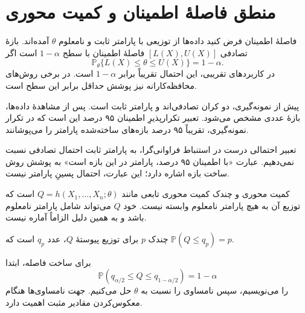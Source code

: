 \documentclass[12pt,a4paper,oneside]{report}
\newcommand{\Prob}{\mathbb P}
\begin{document}
\section{منطق فاصلهٔ اطمینان و کمیت محوری}
\begin{definition}{فاصلهٔ اطمینان}
فرض کنید داده‌ها از توزیعی با پارامتر ثابت و نامعلوم $\theta$ آمده‌اند. بازهٔ تصادفی $[L(X),U(X)]$ فاصلهٔ اطمینان با سطح $1-\alpha$ است اگر
\[\Prob_\theta\{L(X)\le\theta\le U(X)\}=1-\alpha.\]
در کاربردهای تقریبی، این احتمال تقریباً برابر $1-\alpha$ است. در برخی روش‌های محافظه‌کارانه نیز پوشش حداقل برابر این سطح است.
\end{definition}
پیش از نمونه‌گیری، دو کران تصادفی‌اند و پارامتر ثابت است. پس از مشاهدهٔ داده‌ها، بازهٔ عددی مشخص می‌شود. تعبیر تکرارپذیرِ اطمینان ۹۵ درصد این است که در تکرار نمونه‌گیری، تقریباً ۹۵ درصد بازه‌های ساخته‌شده پارامتر را می‌پوشانند.
\begin{important}{تعبیر احتمالی درست}
در استنباط فراوانی‌گرا، به پارامتر ثابت احتمال تصادفی نسبت نمی‌دهیم. عبارت «با اطمینان ۹۵ درصد، پارامتر در این بازه است» به پوشش روش ساخت بازه اشاره دارد؛ این عبارت، احتمال پسینِ پارامتر نیست.
\end{important}
\begin{definition}{کمیت محوری و چندک}
کمیت محوری تابعی مانند $Q=h(X_1,\ldots,X_n;\theta)$ است که توزیع آن به هیچ پارامتر نامعلوم وابسته نیست. خود $Q$ می‌تواند شامل پارامتر نامعلوم باشد و به همین دلیل الزاماً آماره نیست.

چندک $p$ برای توزیع پیوستهٔ $Q$، عدد $q_p$ است که $\Prob(Q\le q_p)=p$.
\end{definition}
برای ساخت فاصله، ابتدا
\[\Prob(q_{\alpha/2}\le Q\le q_{1-\alpha/2})=1-\alpha\]
را می‌نویسیم، سپس نامساوی را نسبت به $\theta$ حل می‌کنیم. جهت نامساوی‌ها هنگام معکوس‌کردن مقادیر مثبت اهمیت دارد.
\end{document}
